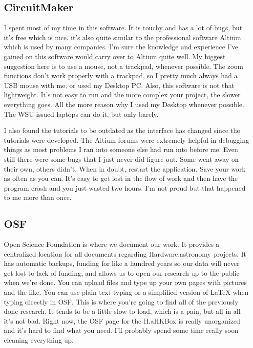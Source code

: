 \documentclass[prb,preprint]{revtex4-1}
\begin{document}
\subsection{CircuitMaker}
I spent most of my time in this software. It is touchy and has a lot of bugs, but it's free which is nice. it's also quite similar to the professional software Altium which is used by many companies. I'm sure the knowledge and experience I've gained on this software would carry over to Altium quite well. My biggest suggestion here is to use a mouse, not a trackpad, whenever possible. The zoom functions don't work properly with a trackpad, so I pretty much always had a USB mouse with me, or used my Desktop PC. Also, this software is not that lightweight. It's not easy to run and the more complex your project, the slower everything goes. All the more reason why I used my Desktop whenever possible. The WSU issued laptops can do it, but only barely. 

I also found the tutorials to be outdated as the interface has changed since the tutorials were developed. The Altium forums were extremely helpful in debugging things as most problems I ran into someone else had run into before me. Even still there were some bugs that I just never did figure out. Some went away on their own, others didn't. When in doubt, restart the application. Save your work as often as you can. It's easy to get lost in the flow of work and then have the program crash and you just wasted two hours. I'm not proud but that happened to me more than once.

\subsection{OSF}
Open Science Foundation is where we document our work. It provides a centralized location for all documents regarding Hardware.astronomy projects. It has automatic backups, funding for like a hundred years so our data will never get lost to lack of funding, and allows us to open our research up to the public when we're done. You can upload files and type up your own pages with pictures and the like. You can use plain text typing or a simplified version of LaTeX when typing directly in OSF. This is where you're going to find all of the previously done research. It tends to be a little slow to load, which is a pain, but all in all it's not bad. Right now, the OSF page for the H.aHKBox is really unorganized and it's hard to find what you need. I'll probably spend some time really soon cleaning everything up.
\end{document}
